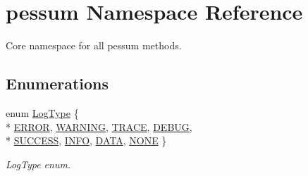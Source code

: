 \hypertarget{namespacepessum}{}\section{pessum Namespace Reference}
\label{namespacepessum}


Core namespace for all pessum methods.  


\subsection*{Enumerations}
\begin{DoxyCompactItemize}
\item 
enum \hyperlink{namespacepessum_a0e205f64abc046e94dd38be906430664}{Log\+Type} \{ \\*
\hyperlink{namespacepessum_a0e205f64abc046e94dd38be906430664a7a719db795e4160dc868c74f3981091b}{E\+R\+R\+OR}, 
\hyperlink{namespacepessum_a0e205f64abc046e94dd38be906430664a5c036e27d2b7f92b600a03d53a5906cf}{W\+A\+R\+N\+I\+NG}, 
\hyperlink{namespacepessum_a0e205f64abc046e94dd38be906430664a99b12a4d8b49bcebb424e72729949bed}{T\+R\+A\+CE}, 
\hyperlink{namespacepessum_a0e205f64abc046e94dd38be906430664a0778c6a211502710df227ef928d45ac0}{D\+E\+B\+UG}, 
\\*
\hyperlink{namespacepessum_a0e205f64abc046e94dd38be906430664a50d013cdaa96d4575835e431e53afb92}{S\+U\+C\+C\+E\+SS}, 
\hyperlink{namespacepessum_a0e205f64abc046e94dd38be906430664a8354844e351c940c08caf14148d082b0}{I\+N\+FO}, 
\hyperlink{namespacepessum_a0e205f64abc046e94dd38be906430664a044bedc99450343e093dc4e9c51fb560}{D\+A\+TA}, 
\hyperlink{namespacepessum_a0e205f64abc046e94dd38be906430664a6d5037a5f004dc37956db8cc5fefed5e}{N\+O\+NE}
 \}\begin{DoxyCompactList}\small\item\em Log\+Type enum. \end{DoxyCompactList}
\end{DoxyCompactItemize}
